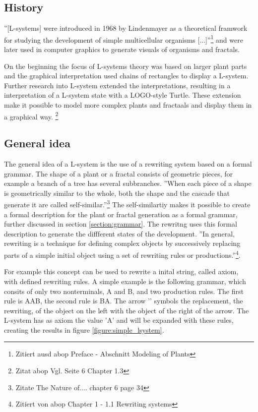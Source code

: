 \documentclass[english]{cpp-hmwk}
\begin{document}
\subsection{History}
\label{section:history}
''[L-systems] were introduced in 1968 by Lindenmayer as a theoretical framwork for studying the development of simple multicellular organisms [...]''\footnote{Zitiert ausd abop Preface - Abschnitt Modeling of Plants} and were later used in computer graphics to generate visuals of organisms and fractals.

On the beginning the focus of L-systems theory was based on larger plant parts and the graphical interpretation used chains of rectangles to display a L-system. Further research into L-system extended the interpretations, resulting in a interpretation of a L-system state with a LOGO-style Turtle. These extension make it possible to model more complex plants and fractaals and display them in a graphical way. \footnote{Zitat abop Vgl. Seite 6 Chapter 1.3}

\subsection{General idea}
\label{section:gerneralidea}
The general idea of a L-system is the use of a rewriting system based on a formal grammar. The shape of a plant or a fractal consists of geometric pieces, for example a branch of a tree has several subbranches. ''When each piece of a shape is geometrically similar to the whole, both the shape and the cascade that generate it are called self-similar.''\footnote{Zitate The Nature of....  chapter 6 page 34 } The self-similartiy makes it possible to create a formal description for the plant or fractal generation as a formal grammar, further discussed in  section \ref{section:grammar}. The rewritng uses this formal description to generate the diffferent states of the development. ''In general, rewriting is a technique for defining complex objects by successively replacing parts of a simple initial object using a set of rewriting rules or productions.''\footnote{Zitiert von abop Chapter 1  - 1.1 Rewriting systems}. 

For example this concept can be used to rewrite a inital string, called axiom, with defined rewriting rules.
A simple example is the following grammar, which consits of only two nonterminals, A and B, and two production rules. 
The first rule is A\rightarrow AB, the second rule is B\rightarrow A. The arrow '\rightarrow' symbols the replacement, the rewriting, of the object on the left with the object of the right of the arrow.
The L-system has as axiom the value 'A' and will be expanded with these rules, creating the results in figure \ref{figure:simple_lsystem}.
\end{document}
